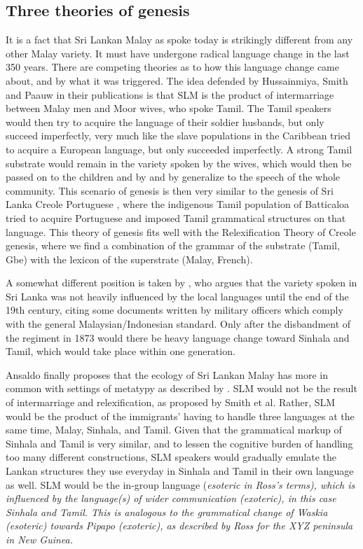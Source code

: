 \subsection{Three theories of genesis}\label{sec:slmbg:Threetheoriesofgenesis}
It is a fact that Sri Lankan Malay as spoke today is strikingly different from any other Malay variety. It must have undergone radical language change in the last 350 years. There are competing theories as to how this language change came about, and by what it was triggered. The idea defended by Hussainmiya, Smith and Paauw in their publications is that SLM is the product of intermarriage between Malay men and Moor wives, who spoke Tamil. The Tamil speakers would then try to acquire the language of their soldier husbands, but only succeed imperfectly, very much like the slave populations in the Caribbean tried to acquire a European language, but only succeeded imperfectly.  A strong Tamil substrate would remain in the  variety spoken by the wives, which would then be passed on to the children and by and by generalize to the speech of the whole community. This scenario of genesis is then very similar to the genesis of Sri Lanka Creole Portuguese \citep{Smith1979}, where the indigenous Tamil population of Batticaloa tried to acquire Portuguese and imposed Tamil grammatical structures on that language. This theory of genesis fits well with the Relexification Theory \citep{Muysken, Lefebvre} of Creole genesis, where we find a combination of the grammar of the substrate (Tamil, Gbe) with the lexicon of the superstrate (Malay, French).

A somewhat different position is taken by \citet{Bakker2000convergence,Bakker2000rapid,Bakker2006}, who argues that the variety spoken in Sri Lanka was not heavily influenced by the local languages until the end of the 19th century, citing some documents written by military officers which comply with the general Malaysian/Indonesian standard. Only after the disbandment of the regiment in 1873 would there be heavy language change toward Sinhala and Tamil\kuckn, which would take place within one generation.

Ansaldo \citep{Ansaldo2005ms,Ansaldo2008genesis} finally proposes that the ecology of Sri Lankan Malay has more in common with settings of metatypy as described by \citep{Ross1996,Ross1997,Ross2007}. SLM would not be the result of intermarriage and  relexification, as proposed by Smith et al. Rather, SLM would be the product of the immigrants' having to handle three languages at the same time, Malay, Sinhala, and Tamil. Given that the grammatical markup of Sinhala and Tamil is very similar, and to lessen the cognitive burden of handling too many different constructions, SLM speakers would gradually emulate the Lankan structures they use everyday in Sinhala and Tamil in their own language as well. SLM would be the in-group language (\em esoteric \em in Ross's terms), which is influenced by the language(s) of wider communication (\em exoteric\em), in this case Sinhala and Tamil. This is analogous to the grammatical change of Waskia (\em esoteric\em) towards Pipapo (\em exoteric\em), as described by Ross for the XYZ peninsula in New Guinea\kuckn.

